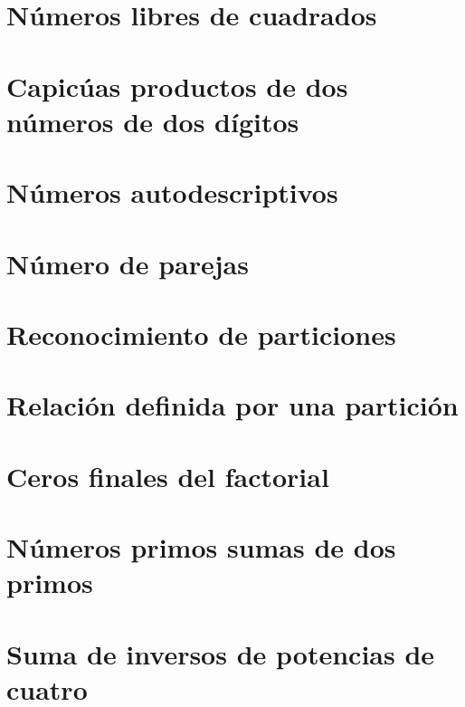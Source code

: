 \documentclass[a4paper,12pt,twoside]{book}
\begin{document}
\chapter{Números libres de cuadrados}

\chapter{Capicúas productos de dos números de dos dígitos}

 
\chapter{Números autodescriptivos}

\chapter{Número de parejas}

\chapter{Reconocimiento de particiones}

\chapter{Relación definida por una partición}

\chapter{Ceros finales del factorial}

 
\chapter{Números primos sumas de dos primos}

\chapter{Suma de inversos de potencias de cuatro}
\end{document}
